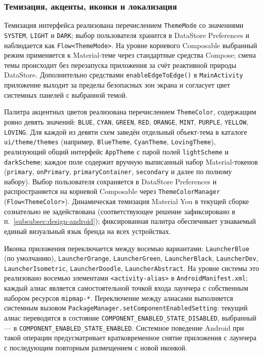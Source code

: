 \subsubsection{Темизация, акценты, иконки и локализация}
\label{subsubsec:impl-android-ui}

Темизация интерфейса реализована перечислением \texttt{ThemeMode} со значениями \texttt{SYSTEM}, \texttt{LIGHT} и \texttt{DARK}; выбор пользователя хранится в DataStore Preferences и наблюдается как \texttt{Flow<ThemeMode>}. На уровне корневого Composable выбранный режим применяется к Material-теме через стандартные средства Compose; смена темы происходит без перезапуска приложения за счёт реактивной природы DataStore. Дополнительно средствами \texttt{enableEdgeToEdge()} в \texttt{MainActivity} приложение выходит за пределы безопасных зон экрана и согласует цвет системных панелей с выбранной темой.

Палитра акцентных цветов реализована перечислением \texttt{ThemeColor}, содержащим ровно девять значений: \texttt{BLUE}, \texttt{CYAN}, \texttt{GREEN}, \texttt{RED}, \texttt{ORANGE}, \texttt{MINT}, \texttt{PURPLE}, \texttt{YELLOW}, \texttt{LOVING}. Для каждой из девяти схем заведён отдельный объект-тема в каталоге \texttt{ui/\allowbreak theme/\allowbreak themes} (например, \texttt{BlueTheme}, \texttt{CyanTheme}, \texttt{LovingTheme}), реализующий общий интерфейс \texttt{AppTheme} с парой полей \texttt{lightScheme} и \texttt{darkScheme}; каждое поле содержит вручную выписанный набор Material-токенов (\texttt{primary}, \texttt{onPrimary}, \texttt{primaryContainer}, \texttt{secondary} и далее по полному набору). Выбор пользователя сохраняется в DataStore Preferences и распространяется на корневой Composable через \texttt{ThemeColor\allowbreak Manager} (\texttt{Flow<ThemeColor>}). Динамическая темизация Material You в текущей сборке сознательно не задействована (соответствующее решение зафиксировано в п.~\ref{subsubsec:design-android}); фиксированная палитра обеспечивает узнаваемый единый визуальный язык бренда на всех устройствах.

Иконка приложения переключается между восемью вариантами: \texttt{LauncherBlue} (по умолчанию), \texttt{LauncherOrange}, \texttt{LauncherGreen}, \texttt{LauncherBlack}, \texttt{LauncherDev}, \texttt{LauncherIsometric}, \texttt{LauncherDoodle}, \texttt{LauncherAbstract}. На уровне системы это реализовано восемью элементами \texttt{<activity-alias>} в \texttt{AndroidManifest.xml}; каждый алиас является самостоятельной точкой входа лаунчера с собственным набором ресурсов \texttt{mipmap-*}. Переключение между алиасами выполняется системным вызовом \texttt{PackageManager.\allowbreak setComponentEnabledSetting}: текущий алиас переводится в состояние \texttt{COMPONENT\allowbreak \_ENABLED\allowbreak \_STATE\allowbreak \_DISABLED}, выбранный --- в \texttt{COMPONENT\allowbreak \_ENABLED\allowbreak \_STATE\allowbreak \_ENABLED}. Системное поведение Android при такой операции предусматривает кратковременное снятие приложения с лаунчера с последующим повторным размещением с новой иконкой.

